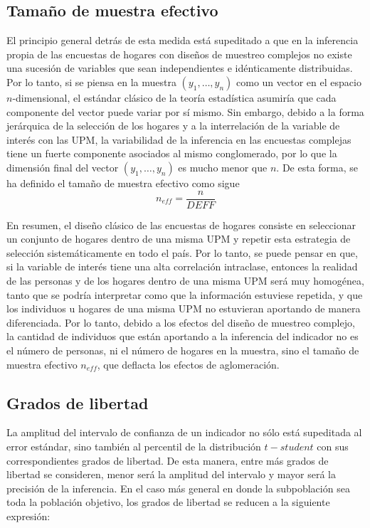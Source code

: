 \documentclass[
  12pt,
  spanish,
]{book}
\begin{document}
\hypertarget{tamauxf1o-de-muestra-efectivo}{%
\subsection{Tamaño de muestra efectivo}\label{tamauxf1o-de-muestra-efectivo}}

El principio general detrás de esta medida está supeditado a que en la inferencia propia de las encuestas de hogares con diseños de muestreo complejos no existe una sucesión de variables que sean independientes e idénticamente distribuidas. Por lo tanto, si se piensa en la muestra \((y_1, \ldots, y_n)\) como un vector en el espacio \(n\)-dimensional, el estándar clásico de la teoría estadística asumiría que cada componente del vector puede variar por sí mismo. Sin embargo, debido a la forma jerárquica de la selección de los hogares y a la interrelación de la variable de interés con las UPM, la variabilidad de la inferencia en las encuestas complejas tiene un fuerte componente asociados al mismo conglomerado, por lo que la dimensión final del vector \((y_1, \ldots, y_n)\) es mucho menor que \(n\). De esta forma, se ha definido el tamaño de muestra efectivo \citep[capítulo 6]{United_Nations_2005} como sigue
\[
n_{eff} = \frac{n}{DEFF}
\]

En resumen, el diseño clásico de las encuestas de hogares consiste en seleccionar un conjunto de hogares dentro de una misma UPM y repetir esta estrategia de selección sistemáticamente en todo el país. Por lo tanto, se puede pensar en que, si la variable de interés tiene una alta correlación intraclase, entonces la realidad de las personas y de los hogares dentro de una misma UPM será muy homogénea, tanto que se podría interpretar como que la información estuviese repetida, y que los individuos u hogares de una misma UPM no estuvieran aportando de manera diferenciada. Por lo tanto, debido a los efectos del diseño de muestreo complejo, la cantidad de individuos que están aportando a la inferencia del indicador no es el número de personas, ni el número de hogares en la muestra, sino el tamaño de muestra efectivo \(n_{eff}\), que deflacta los efectos de aglomeración.

\hypertarget{grados-de-libertad}{%
\subsection{Grados de libertad}\label{grados-de-libertad}}

La amplitud del intervalo de confianza de un indicador no sólo está supeditada al error estándar, sino también al percentil de la distribución \(t-student\) con sus correspondientes grados de libertad. De esta manera, entre más grados de libertad se consideren, menor será la amplitud del intervalo y mayor será la precisión de la inferencia. En el caso más general en donde la subpoblación sea toda la población objetivo, los grados de libertad se reducen a la siguiente expresión:
\end{document}
